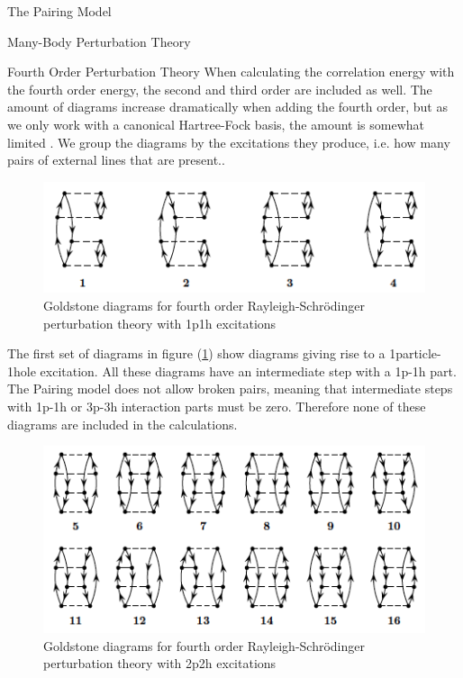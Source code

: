 \documentclass[twoside,english]{uiofysmaster}
\begin{document}
\begin{chapter}{The Pairing Model}
\begin{section}{Many-Body Perturbation Theory}
		\begin{subsection}{Fourth Order Perturbation Theory}
			When calculating the correlation energy with the fourth order energy, the second and third order are included as well. The amount of diagrams increase dramatically when adding the fourth order, but as we only work with a canonical Hartree-Fock basis, the amount is somewhat limited \cite{ShavittAndBartlett}. We group the diagrams by the excitations they produce, i.e. how many pairs of external lines that are present.. 
			\begin{figure}[H]
				\includegraphics[width=\textwidth]{Figures/fourthorder1p1h.png}
				\caption{Goldstone diagrams for fourth order Rayleigh-Schr\"{o}dinger perturbation theory with 1p1h excitations}
				\label{figure:mbpt1p1h}
			\end{figure}
			The first set of diagrams in figure (\ref{figure:mbpt1p1h}) show diagrams giving rise to a 1particle-1hole excitation. All these diagrams have an intermediate step with a 1p-1h part. The Pairing model does not allow broken pairs, meaning that intermediate steps with 1p-1h or 3p-3h interaction parts must be zero. Therefore none of these diagrams are included in the calculations.
			\begin{figure}[H]
				\includegraphics[width=\textwidth]{Figures/fourthorder2p2h.png}
				\caption{Goldstone diagrams for fourth order Rayleigh-Schr\"{o}dinger perturbation theory with 2p2h excitations}
				\label{figure:mbpt2p2h}
			\end{figure}

\end{subsection}
\end{section}
\end{chapter}
\end{document}
